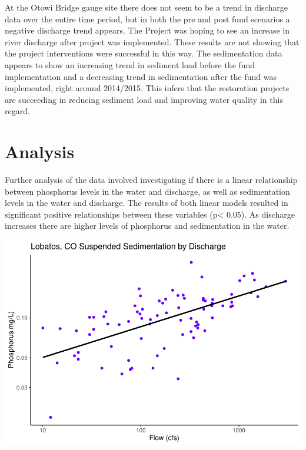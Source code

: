 \documentclass[
  12pt,
]{article}
\begin{document}
At the Otowi Bridge gauge site there does not seem to be a trend in
discharge data over the entire time period, but in both the pre and post
fund scenarios a negative discharge trend appears. The Project was
hoping to see an increase in river discharge after project was
implemented. These results are not showing that the project
interventions were successful in this way. The sedimentation data
appears to show an increasing trend in sediment load before the fund
implementation and a decreasing trend in sedimentation after the fund
was implemented, right around 2014/2015. This infers that the
restoration projects are succeeding in reducing sediment load and
improving water quality in this regard.

\newpage

\hypertarget{analysis}{%
\section{Analysis}\label{analysis}}

Further analysis of the data involved investigating if there is a linear
relationship between phosphorus levels in the water and discharge, as
well as sedimentation levels in the water and discharge. The results of
both linear models resulted in significant positive relationships
between these variables (p\textless{} 0.05). As discharge increases
there are higher levels of phosphorus and sedimentation in the water.

\includegraphics{Project_Template_files/figure-latex/unnamed-chunk-4-1.pdf}
\end{document}
